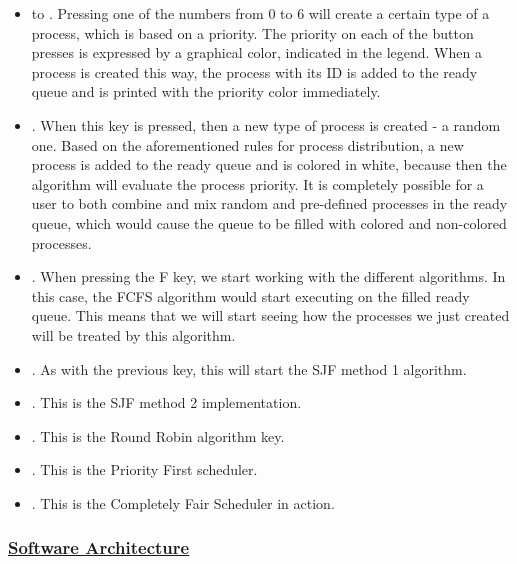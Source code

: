 \documentclass{article}
\newcommand{\code}[1]{\codeinline{\texttt{#1}}}
\begin{document}
\begin{itemize}
\item \code{0} to \code{6}. Pressing one of the numbers from 0 to 6 will create a certain type of a process, which is based on a priority. The priority on each of the button presses is expressed by a graphical color, indicated in the legend. When a process is created this way, the process with its ID is added to the ready queue and is printed with the priority color immediately.
\item \code{r}. When this key is pressed, then a new type of process is created - a random one. Based on the aforementioned rules for process distribution, a new process is added to the ready queue and is colored in white, because then the algorithm will evaluate the process priority. It is completely possible for a user to both combine and mix random and pre-defined processes in the ready queue, which would cause the queue to be filled with colored and non-colored processes.
\item \code{f}. When pressing the F key, we start working with the different algorithms. In this case, the FCFS algorithm would start executing on the filled ready queue. This means that we will start seeing how the processes we just created will be treated by this algorithm.
\item \code{h}. As with the previous key, this will start the SJF method 1 algorithm.
\item \code{s}. This is the SJF method 2 implementation.
\item \code{o}. This is the Round Robin algorithm key.
\item \code{p}. This is the Priority First scheduler.
\item \code{c}. This is the Completely Fair Scheduler in action.
\end{itemize}

\subsubsection{\underline{Software Architecture}}
\end{document}
